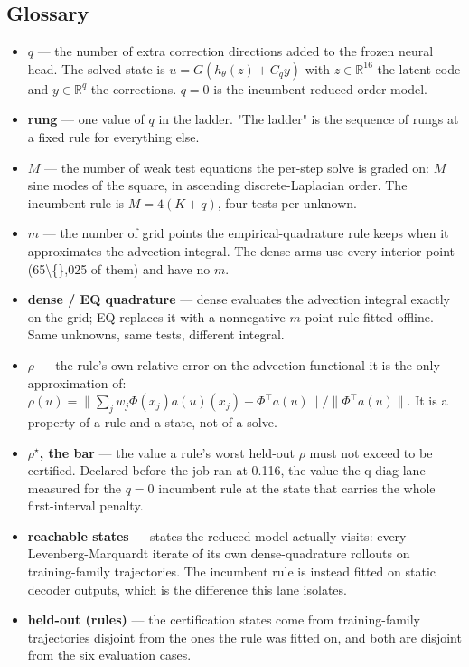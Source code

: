\documentclass[11pt]{article}
\begin{document}
\subsection{Glossary}
\begin{itemize}
\item \textbf{$q$} --- the number of extra correction directions added to the frozen neural head. The solved state is $u = G(h_\theta(z) + C_q y)$ with $z \in \mathbb{R}^{16}$ the latent code and $y \in \mathbb{R}^{q}$ the corrections. $q = 0$ is the incumbent reduced-order model.
\item \textbf{rung} --- one value of $q$ in the ladder. "The ladder" is the sequence of rungs at a fixed rule for everything else.
\item \textbf{$M$} --- the number of weak test equations the per-step solve is graded on: $M$ sine modes of the square, in ascending discrete-Laplacian order. The incumbent rule is $M = 4(K+q)$, four tests per unknown.
\item \textbf{$m$} --- the number of grid points the empirical-quadrature rule keeps when it approximates the advection integral. The dense arms use every interior point (65\textbackslash\{\},025 of them) and have no $m$.
\item \textbf{dense / EQ quadrature} --- dense evaluates the advection integral exactly on the grid; EQ replaces it with a nonnegative $m$-point rule fitted offline. Same unknowns, same tests, different integral.
\item \textbf{$\rho$} --- the rule's own relative error on the advection functional it is the only approximation of: $\rho(u) = \|\sum_j w_j \Phi(x_j) a(u)(x_j) - \Phi^\top a(u)\| / \|\Phi^\top a(u)\|$. It is a property of a rule and a state, not of a solve.
\item \textbf{$\rho^\star$, the bar} --- the value a rule's worst held-out $\rho$ must not exceed to be certified. Declared before the job ran at 0.116, the value the q-diag lane measured for the $q=0$ incumbent rule at the state that carries the whole first-interval penalty.
\item \textbf{reachable states} --- states the reduced model actually visits: every Levenberg-Marquardt iterate of its own dense-quadrature rollouts on training-family trajectories. The incumbent rule is instead fitted on static decoder outputs, which is the difference this lane isolates.
\item \textbf{held-out (rules)} --- the certification states come from training-family trajectories disjoint from the ones the rule was fitted on, and both are disjoint from the six evaluation cases.

\end{itemize}
\end{document}
